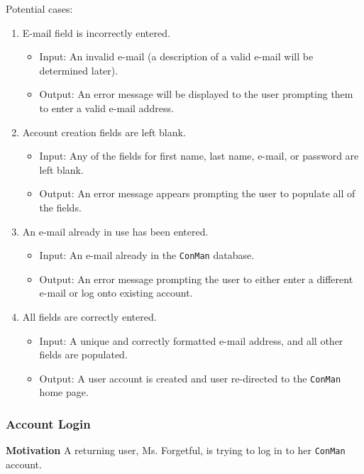 \documentclass{article}
\begin{document}
Potential cases:
\begin{enumerate}
    \item E-mail field is incorrectly entered.
        \begin{itemize}
            \item Input: An invalid e-mail (a description of a valid e-mail will be determined later).
            \item Output: An error message will be displayed to the user prompting them to enter a valid e-mail address.
        \end{itemize}
    \item Account creation fields are left blank.
        \begin{itemize}
            \item Input: Any of the fields for first name, last name, e-mail, or password are left blank.
            \item Output: An error message appears prompting the user to populate all of the fields.
        \end{itemize}
    \item An e-mail already in use has been entered.
        \begin{itemize}
            \item Input: An e-mail already in the \texttt{ConMan} database.
            \item Output: An error message prompting the user to either enter a different e-mail or log onto existing account.
        \end{itemize}
    \item All fields are correctly entered.
        \begin{itemize}
            \item Input: A unique and correctly formatted e-mail address, and all other fields are populated.
            \item Output: A user account is created and user re-directed to the \texttt{ConMan} home page.
        \end{itemize}
\end{enumerate}

\subsubsection{Account Login}
\textbf{Motivation} A returning user, Ms. Forgetful, is trying to log in to her \texttt{ConMan} account.
\end{document}
